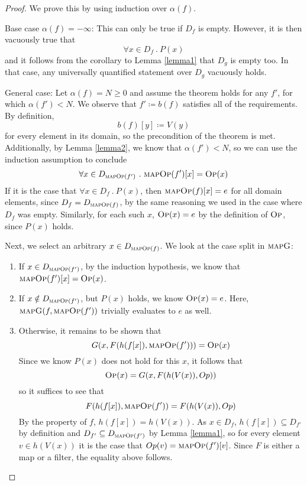\begin{proof}
We prove this by using induction over $\alpha(f)$.

Base case $\alpha(f) = -\infty$: This can only be true if $D_f$ is empty. However, it is then vacuously true that 
\[
\forall x \in D_f \ .\ P(x)
\]
and it follows from the corollary to Lemma \ref{lemma1} that $D_g$ is empty too. In that case, any universally quantified statement over $D_g$ vacuously holds.

General case: Let $\alpha(f) = N \ge 0$ and assume the theorem holds for any $f'$, for which $\alpha(f') < N$.
We observe that $f' \coloneqq b(f)$ satisfies all of the requirements. By definition, 
\[
b(f)[y] \coloneqq V(y)
\]
for every element in its domain, so the precondition of the theorem is met. Additionally, by Lemma \ref{lemma2}, we know that $\alpha(f') < N$, so we can use the induction assumption to conclude 
\[
\forall x \in D_{\textsc{mapOp}(f')} \ .\ \textsc{mapOp}(f')[x] = \textsc{Op}(x)
\]
If it is the case that $\forall x \in D_f \ .\ P(x)$, then $\textsc{mapOp}(f)[x] = e$ for all domain elements, since 
$D_f = D_{\textsc{mapOp}(f)}$, by the same reasoning we used in the case where $D_f$ was empty. Similarly, for each such $x$, $\textsc{Op}(x) = e$ by the definition of $\textsc{Op}$, since $P(x)$ holds.

Next, we select an arbitrary $x \in D_{\textsc{mapOp}(f)}$. We look at the case split in $\textsc{mapG}$:
\begin{enumerate}
\item If $x \in D_{\textsc{mapOp}(f')}$, by the induction hypothesis, we know that $\textsc{mapOp}(f')[x] = \textsc{Op}(x)$.
\item If $x \notin D_{\textsc{mapOp}(f')}$, but $P(x)$ holds, we know $\textsc{Op}(x) = e$. Here, $\textsc{mapG}(f, \textsc{mapOp}(f'))$ trivially evaluates to $e$ as well.
\item Otherwise, it remains to be shown that
\[
G(x, F(h(f[x]), \textsc{mapOp}(f'))) = \textsc{Op}(x)
\]
Since we know $P(x)$ does not hold for this $x$, it follows that
\[
\textsc{Op}(x) = G(x, F(h(V(x)), Op))
\]
so it suffices to see that 
\[
F(h(f[x]), \textsc{mapOp}(f')) = F(h(V(x)), Op)
\]
By the property of $f$, $h(f[x]) = h(V(x))$. As $x \in D_f$, $h(f[x]) \subseteq D_{f'}$ by definition and $D_{f'} \subseteq D_{\textsc{mapOp}(f')}$ by Lemma \ref{lemma1}, so for every element $v \in h(V(x))$ it is the case that $Op(v) = \textsc{mapOp}(f')[v]$. Since $F$ is either a map or a filter, the equality above follows.

\end{enumerate}

\end{proof}

